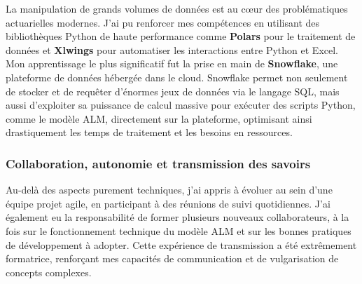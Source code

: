 La manipulation de grands volumes de données est au cœur des problématiques actuarielles modernes. J'ai pu renforcer mes compétences en utilisant des bibliothèques Python de haute performance comme \textbf{Polars} pour le traitement de données et \textbf{Xlwings} pour automatiser les interactions entre Python et Excel. Mon apprentissage le plus significatif fut la prise en main de \textbf{Snowflake}, une plateforme de données hébergée dans le cloud. Snowflake permet non seulement de stocker et de requêter d'énormes jeux de données via le langage SQL, mais aussi d'exploiter sa puissance de calcul massive pour exécuter des scripts Python, comme le modèle ALM, directement sur la plateforme, optimisant ainsi drastiquement les temps de traitement et les besoins en ressources.



\subsubsection{Collaboration, autonomie et transmission des savoirs}

Au-delà des aspects purement techniques, j'ai appris à évoluer au sein d'une équipe projet agile, en participant à des réunions de suivi quotidiennes. J'ai également eu la responsabilité de former plusieurs nouveaux collaborateurs, à la fois sur le fonctionnement technique du modèle ALM et sur les bonnes pratiques de développement à adopter. Cette expérience de transmission a été extrêmement formatrice, renforçant mes capacités de communication et de vulgarisation de concepts complexes.